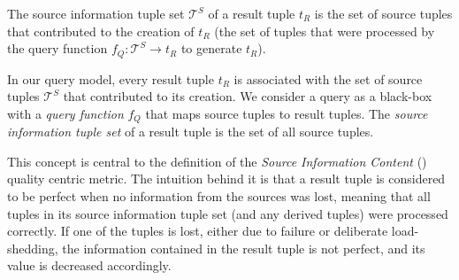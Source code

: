 \begin{definition} 
The source information tuple set $\mathcal{T}^{S}$ of a result tuple $t_{R}$ is the set of source tuples
that contributed to the creation of $t_{R}$ (\ie the set of tuples that were processed by the query
function $f_Q : \mathcal{T}^{S} \rightarrow t_{R}$ to generate $t_{R}$).
\end{definition}
In our query model, every result tuple $t_{R}$ is associated with the set of source tuples
$\mathcal{T}^{S}$ that contributed to its creation. We consider a query as a black-box with a \emph{query
function} $f_Q$ that maps source tuples to result tuples. The \textit{source information tuple set} of a
result tuple is the set of all source tuples. 

This concept is central to the definition of the \textit{Source Information Content} (\sic) quality
centric metric. The intuition behind it is that a result tuple is considered to be perfect when no
information from the sources was lost, meaning that all tuples in its source information tuple set (and
any derived tuples) were processed correctly. If one of the tuples is lost, either due to failure or
deliberate load-shedding, the information contained in the result tuple is not perfect, and its \sic
value is decreased accordingly.

